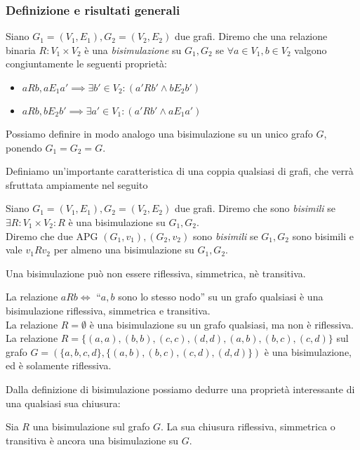 \subsubsection{Definizione e risultati generali}
\begin{definition}
    Siano $G_1 = (V_1,E_1), G_2 = (V_2,E_2)$ due grafi. Diremo che una relazione binaria $R: V_1 \times V_2$ è una \emph{bisimulazione} su $G_1, G_2$ se $\forall a \in V_1, b \in V_2$ valgono congiuntamente le seguenti proprietà:
    \begin{itemize}
        \item $a R b, a E_1 a' \implies \exists b' \in V_2 : (a' R b' \land b E_2 b')$
        \item $a R b, b E_2 b' \implies \exists a' \in V_1 : (a' R b' \land a E_1 a')$
    \end{itemize}
    Possiamo definire in modo analogo una bisimulazione su un unico grafo $G$, ponendo $G_1 = G_2 = G$.
\end{definition}
Definiamo un'importante caratteristica di una coppia qualsiasi di grafi, che verrà sfruttata ampiamente nel seguito
\begin{definition}
    Siano $G_1 = (V_1,E_1), G_2 = (V_2,E_2)$ due grafi. Diremo che sono \emph{bisimili} se $\exists R: V_1 \times V_2 : R$ è una bisimulazione su $G_1, G_2$.\\
    Diremo che due APG $(G_1, v_1), (G_2, v_2)$ sono \emph{bisimili} se $G_1, G_2$ sono bisimili e vale $v_1 R v_2$ per almeno una bisimulazione su $G_1, G_2$.
\end{definition}
\begin{observation}
    Una bisimulazione può non essere riflessiva, simmetrica, nè transitiva.
\end{observation}
\begin{example}
    La relazione $a R b \iff$ ``$a,b$ sono lo stesso nodo'' su un grafo qualsiasi è una bisimulazione riflessiva, simmetrica e transitiva.\\
    La relazione $R = \emptyset$ è una bisimulazione su un grafo qualsiasi, ma non è riflessiva.\\
    La relazione $R = \{(a,a),(b,b),(c,c),(d,d),(a,b),(b,c),(c,d)\}$ sul grafo $G = (\{a,b,c,d\}, \{(a,b),(b,c),(c,d),(d,d)\})$ è una bisimulazione, ed è solamente riflessiva.
\end{example}
Dalla definizione di bisimulazione possiamo dedurre una proprietà interessante di una qualsiasi sua chiusura:
\begin{theorem}
    Sia $R$ una bisimulazione sul grafo $G$. La sua chiusura riflessiva, simmetrica o transitiva è ancora una bisimulazione su $G$.
\end{theorem}
